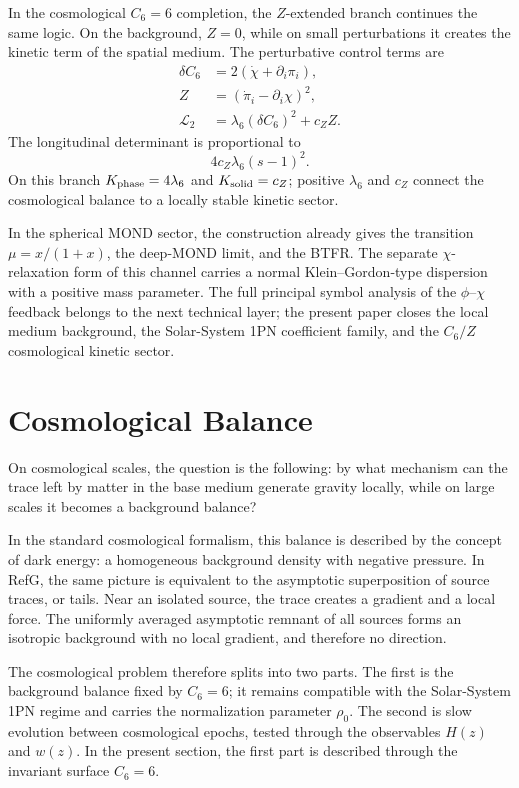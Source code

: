 \documentclass[12pt]{article}
\begin{document}
In the cosmological $C_6=6$ completion, the $Z$-extended branch continues the same logic. On the background, $Z=0$, while on small perturbations it creates the kinetic term of the spatial medium. The perturbative control terms are
\begin{align}
\delta C_6 &= 2(\dot\chi+\partial_i\pi_i), \\
Z &= (\dot\pi_i-\partial_i\chi)^2, \\
\mathcal L_2 &= \lambda_6(\delta C_6)^2+c_Z Z .
\end{align}
The longitudinal determinant is proportional to
\begin{equation}
4c_Z\lambda_6(s-1)^2 .
\end{equation}
On this branch $K_{\rm phase}=4\lambda_6$ and $K_{\rm solid}=c_Z$; positive $\lambda_6$ and $c_Z$ connect the cosmological balance to a locally stable kinetic sector.

In the spherical MOND sector, the construction already gives the transition $\mu=x/(1+x)$, the deep-MOND limit, and the BTFR. The separate $\chi$-relaxation form of this channel carries a normal Klein--Gordon-type dispersion with a positive mass parameter. The full principal symbol analysis of the $\phi$--$\chi$ feedback belongs to the next technical layer; the present paper closes the local medium background, the Solar-System 1PN coefficient family, and the $C_6/Z$ cosmological kinetic sector.

\section{Cosmological Balance}

On cosmological scales, the question is the following: by what mechanism can the trace left by matter in the base medium generate gravity locally, while on large scales it becomes a background balance?

In the standard cosmological formalism, this balance is described by the concept of dark energy: a homogeneous background density with negative pressure. In RefG, the same picture is equivalent to the asymptotic superposition of source traces, or tails. Near an isolated source, the trace creates a gradient and a local force. The uniformly averaged asymptotic remnant of all sources forms an isotropic background with no local gradient, and therefore no direction.

The cosmological problem therefore splits into two parts. The first is the background balance fixed by $C_6=6$; it remains compatible with the Solar-System 1PN regime and carries the normalization parameter $\rho_0$. The second is slow evolution between cosmological epochs, tested through the observables $H(z)$ and $w(z)$. In the present section, the first part is described through the invariant surface $C_6=6$.
\end{document}
